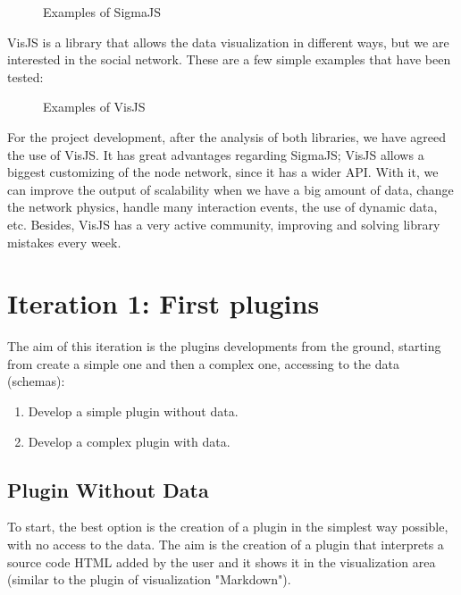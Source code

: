 \documentclass[a4paper, 12pt]{book}
\begin{document}
\begin{figure}[H]
 \centering
 \caption{Examples of SigmaJS}
 \label{f:sigmaexamples}
\end{figure}

VisJS is a library that allows the data visualization in different ways, but we are interested in the social network. These are a few simple examples that have been tested:

\begin{figure}[H]
 \centering
 \caption{Examples of VisJS}
 \label{f:sigmaexamples}
\end{figure}

For the project development, after the analysis of both libraries, we have agreed the use of VisJS. It has great advantages regarding SigmaJS; VisJS allows a biggest customizing of the node network, since it has a wider API. With it, we can improve the output of scalability when we have a big amount of data, change the network physics, handle many interaction events, the use of dynamic data, etc. Besides, VisJS has a very active community, improving and solving library mistakes every week.

\section{Iteration 1: First plugins}

The aim of this iteration is the plugins developments from the ground, starting from create a simple one and then a complex one, accessing to the data (schemas):

\begin{enumerate}
\item Develop a simple plugin without data.
\item Develop a complex plugin with data.
\end{enumerate}

\subsection{Plugin Without Data}

To start, the best option is the creation of a plugin in the simplest way possible, with no access to the data. The aim is the creation of a plugin that interprets a source code HTML added by the user and it shows it in the visualization area (similar to the plugin of visualization "Markdown"). 
\end{document}
